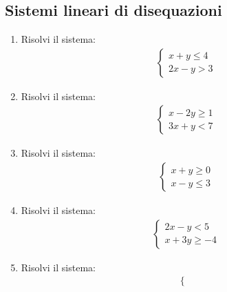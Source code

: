 \documentclass[letterpaper,10pt,italian]{jupyterBook}
\begin{document}
\subsection{Sistemi lineari di disequazioni}
\label{\detokenize{ch/algebra/real-n-algebra:sistemi-lineari-di-disequazioni}}\begin{enumerate}
%
\item {} 
\sphinxAtStartPar
Risolvi il sistema:
\begin{equation*}
\begin{split}
   \begin{cases}
   x + y \leq 4 \\
   2x - y > 3
   \end{cases}
   \end{split}
\end{equation*}
\item {} 
\sphinxAtStartPar
Risolvi il sistema:
\begin{equation*}
\begin{split}
   \begin{cases}
   x - 2y \geq 1 \\
   3x + y < 7
   \end{cases}
   \end{split}
\end{equation*}
\item {} 
\sphinxAtStartPar
Risolvi il sistema:
\begin{equation*}
\begin{split}
   \begin{cases}
   x + y \geq 0 \\
   x - y \leq 3
   \end{cases}
   \end{split}
\end{equation*}
\item {} 
\sphinxAtStartPar
Risolvi il sistema:
\begin{equation*}
\begin{split}
    \begin{cases}
    2x - y < 5 \\
    x + 3y \geq -4
    \end{cases}
    \end{split}
\end{equation*}
\item {} 
\sphinxAtStartPar
Risolvi il sistema:
\begin{equation*}
\begin{split}
    \begin{cases}

\end{cases}
\end{split}
\end{equation*}
\end{enumerate}
\end{document}
